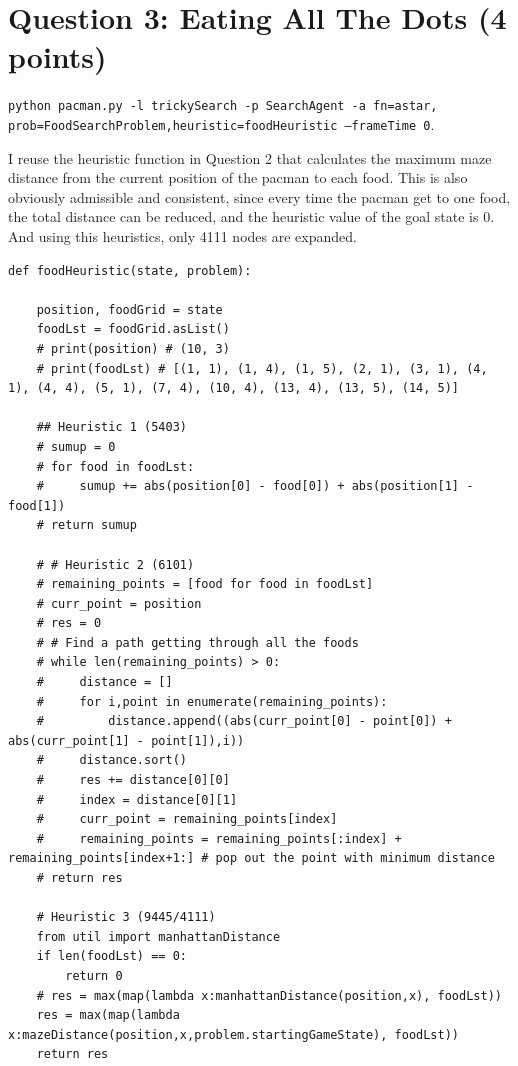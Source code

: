 \documentclass[a4paper, 11pt]{article}
\begin{document}
\section{Question 3: Eating All The Dots (4 points)}
\texttt{python pacman.py -l trickySearch -p SearchAgent -a fn=astar,\\prob=FoodSearchProblem,heuristic=foodHeuristic --frameTime 0}.

I reuse the heuristic function in Question 2 that calculates the maximum maze distance from the current position of the pacman to each food.
This is also obviously admissible and consistent, since every time the pacman get to one food, the total distance can be reduced, and the heuristic value of the goal state is 0.
And using this heuristics, only 4111 nodes are expanded.

\begin{lstlisting}
def foodHeuristic(state, problem):

    position, foodGrid = state
    foodLst = foodGrid.asList()
    # print(position) # (10, 3)
    # print(foodLst) # [(1, 1), (1, 4), (1, 5), (2, 1), (3, 1), (4, 1), (4, 4), (5, 1), (7, 4), (10, 4), (13, 4), (13, 5), (14, 5)]

    ## Heuristic 1 (5403)
    # sumup = 0
    # for food in foodLst:
    #     sumup += abs(position[0] - food[0]) + abs(position[1] - food[1])
    # return sumup

    # # Heuristic 2 (6101)
    # remaining_points = [food for food in foodLst]
    # curr_point = position
    # res = 0
    # # Find a path getting through all the foods
    # while len(remaining_points) > 0:
    #     distance = []
    #     for i,point in enumerate(remaining_points):
    #         distance.append((abs(curr_point[0] - point[0]) + abs(curr_point[1] - point[1]),i))
    #     distance.sort()
    #     res += distance[0][0]
    #     index = distance[0][1]
    #     curr_point = remaining_points[index]
    #     remaining_points = remaining_points[:index] + remaining_points[index+1:] # pop out the point with minimum distance
    # return res

    # Heuristic 3 (9445/4111)
    from util import manhattanDistance
    if len(foodLst) == 0:
        return 0
    # res = max(map(lambda x:manhattanDistance(position,x), foodLst))
    res = max(map(lambda x:mazeDistance(position,x,problem.startingGameState), foodLst))
    return res
\end{lstlisting}
\end{document}
